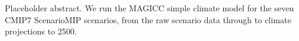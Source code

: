 Placeholder abstract.
We run the MAGICC simple climate model for the seven CMIP7 ScenarioMIP scenarios,
from the raw scenario data through to climate projections to 2500.

